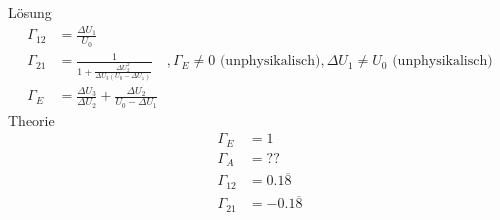 Lösung
\begin{align}
	\Gamma_{12} &= \frac{\Delta U_1}{U_0} \\
	\Gamma_{21} &= \frac{1}{1+\frac{\Delta U_2^2}{\Delta U_3(U_0-\Delta U_1)}} \quad, \Gamma_E \not= 0\text{ (unphysikalisch)}, \Delta U_1 \not= U_0\text{ (unphysikalisch)} \\
	\Gamma_E &= \frac{\Delta U_3}{\Delta U_2} + \frac{\Delta U_2}{U_0-\Delta U_1}
\end{align}
Theorie
\begin{align}
	\Gamma_E &= 1 \\
	\Gamma_A &= ?? \\
	\Gamma_{12} &= 0.1\overline{8} \\
	\Gamma_{21} &= -0.1\overline{8}
\end{align}